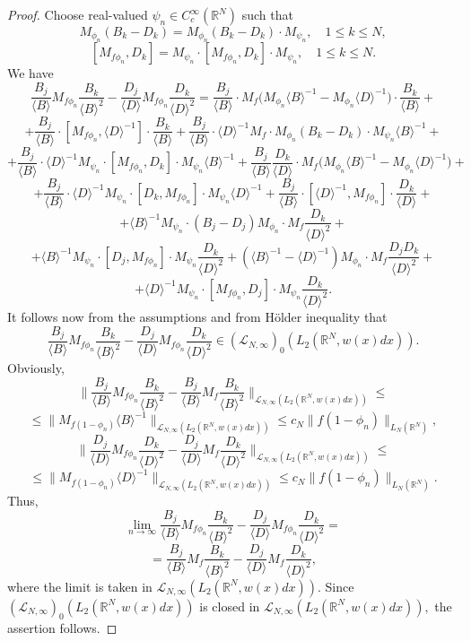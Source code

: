 \documentclass{amsart}
\begin{document}
\begin{proof} Choose real-valued $\psi_n\in C^{\infty}_c(\mathbb{R}^N)$ such that
$$M_{\phi_n}(B_k-D_k)=M_{\phi_n}(B_k-D_k)\cdot M_{\psi_n},\quad 1\leq k\leq N,$$
$$[M_{f\phi_n},D_k]=M_{\psi_n}\cdot [M_{f\phi_n},D_k]\cdot M_{\psi_n},\quad 1\leq k\leq N.$$
We have
$$\frac{B_j}{\langle B\rangle}M_{f\phi_n}\frac{B_k}{\langle B\rangle^2}-\frac{D_j}{\langle D\rangle}M_{f\phi_n}\frac{D_k}{\langle D\rangle^2}=\frac{B_j}{\langle B\rangle}\cdot M_f\Big(M_{\phi_n}\langle B\rangle^{-1}-M_{\phi_n}\langle D\rangle^{-1}\Big)\cdot\frac{B_k}{\langle B\rangle}+$$
$$+\frac{B_j}{\langle B\rangle}\cdot [M_{f\phi_n},\langle D\rangle^{-1}]\cdot\frac{B_k}{\langle B\rangle}+\frac{B_j}{\langle B\rangle}\cdot\langle D\rangle^{-1}M_f\cdot M_{\phi_n}(B_k-D_k)\cdot M_{\psi_n}\langle B\rangle^{-1}+$$
$$+\frac{B_j}{\langle B\rangle}\cdot\langle D\rangle^{-1}M_{\psi_n}\cdot[M_{f\phi_n},D_k]\cdot M_{\psi_n}\langle B\rangle^{-1}+\frac{B_j}{\langle B\rangle}\frac{D_k}{\langle D\rangle}\cdot M_f\Big(M_{\phi_n}\langle B\rangle^{-1}-M_{\phi_n}\langle D\rangle^{-1}\Big)+$$
$$+\frac{B_j}{\langle B\rangle}\cdot\langle D\rangle^{-1}M_{\psi_n}\cdot[D_k,M_{f\phi_n}]\cdot M_{\psi_n}\langle D\rangle^{-1}+\frac{B_j}{\langle B\rangle}\cdot[\langle D\rangle^{-1},M_{f\phi_n}]\cdot\frac{D_k}{\langle D\rangle}+$$
$$+\langle B\rangle^{-1}M_{\psi_n}\cdot (B_j-D_j)M_{\phi_n}\cdot M_f\frac{D_k}{\langle D\rangle^2}+$$
$$+\langle B\rangle^{-1}M_{\psi_n}\cdot [D_j,M_{f\phi_n}]\cdot M_{\psi_n}\frac{D_k}{\langle D\rangle^2}+(\langle B\rangle^{-1}-\langle D\rangle^{-1})M_{\phi_n}\cdot M_f\frac{D_jD_k}{\langle D\rangle^2}+$$
$$+\langle D\rangle^{-1}M_{\psi_n}\cdot[M_{f\phi_n},D_j]\cdot M_{\psi_n}\frac{D_k}{\langle D\rangle^2}.$$
It follows now from the assumptions and from H\"older inequality that
$$\frac{B_j}{\langle B\rangle}M_{f\phi_n}\frac{B_k}{\langle B\rangle^2}-\frac{D_j}{\langle D\rangle}M_{f\phi_n}\frac{D_k}{\langle D\rangle^2}\in(\mathcal{L}_{N,\infty})_0(L_2(\mathbb{R}^N,w(x)dx)).$$
Obviously,
$$\Big\|\frac{B_j}{\langle B\rangle}M_{f\phi_n}\frac{B_k}{\langle B\rangle^2}-\frac{B_j}{\langle B\rangle}M_f\frac{B_k}{\langle B\rangle^2}\Big\|_{\mathcal{L}_{N,\infty}(L_2(\mathbb{R}^N,w(x)dx))}\leq$$
$$\leq\Big\|M_{f(1-\phi_n)}\langle B\rangle^{-1}\Big\|_{\mathcal{L}_{N,\infty}(L_2(\mathbb{R}^N,w(x)dx))}\leq c_N\|f(1-\phi_n)\|_{L_N(\mathbb{R}^N)},$$
$$\Big\|\frac{D_j}{\langle D\rangle}M_{f\phi_n}\frac{D_k}{\langle D\rangle^2}-\frac{D_j}{\langle D\rangle}M_f\frac{D_k}{\langle D\rangle^2}\Big\|_{\mathcal{L}_{N,\infty}(L_2(\mathbb{R}^N,w(x)dx))}\leq$$
$$\leq\Big\|M_{f(1-\phi_n)}\langle D\rangle^{-1}\Big\|_{\mathcal{L}_{N,\infty}(L_2(\mathbb{R}^N,w(x)dx))}\leq c_N\|f(1-\phi_n)\|_{L_N(\mathbb{R}^N)}.$$
Thus,
$$\lim_{n\to\infty}\frac{B_j}{\langle B\rangle}M_{f\phi_n}\frac{B_k}{\langle B\rangle^2}-\frac{D_j}{\langle D\rangle}M_{f\phi_n}\frac{D_k}{\langle D\rangle^2}=$$
$$=\frac{B_j}{\langle B\rangle}M_f\frac{B_k}{\langle B\rangle^2}-\frac{D_j}{\langle D\rangle}M_f\frac{D_k}{\langle D\rangle^2},$$
where the limit is taken in $\mathcal{L}_{N,\infty}(L_2(\mathbb{R}^N,w(x)dx)).$ Since $(\mathcal{L}_{N,\infty})_0(L_2(\mathbb{R}^N,w(x)dx))$ is closed in $\mathcal{L}_{N,\infty}(L_2(\mathbb{R}^N,w(x)dx)),$ the assertion follows.
\end{proof}
\end{document}
